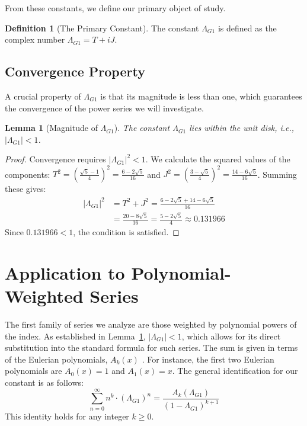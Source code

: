 \documentclass{amsart}
\theoremstyle{plain}
\newtheorem{lemma}[theorem]{Lemma}
\theoremstyle{definition}
\newtheorem{definition}[theorem]{Definition}
\theoremstyle{remark}
\newcommand{\LambdaG}{\Lambda_{G1}}
\begin{document}
From these constants, we define our primary object of study.
\begin{definition}[The Primary Constant]
The constant $\LambdaG$ is defined as the complex number $\LambdaG = T+iJ$.
\end{definition}

\subsection{Convergence Property}
A crucial property of $\LambdaG$ is that its magnitude is less than one, which guarantees the convergence of the power series we will investigate.

\begin{lemma}[Magnitude of $\LambdaG$]
\label{lem:convergence}
The constant $\LambdaG$ lies within the unit disk, i.e., $|\LambdaG| < 1$.
\end{lemma}
\begin{proof}
Convergence requires $|\LambdaG|^2 < 1$. We calculate the squared values of the components:
$T^2 = \left(\frac{\sqrt{5}-1}{4}\right)^2 = \frac{6-2\sqrt{5}}{16}$ and $J^2 = \left(\frac{3-\sqrt{5}}{4}\right)^2 = \frac{14-6\sqrt{5}}{16}$.
Summing these gives:
\begin{align*}
    |\LambdaG|^2 &= T^2+J^2 = \frac{6-2\sqrt{5} + 14-6\sqrt{5}}{16} \\
                 &= \frac{20-8\sqrt{5}}{16} = \frac{5-2\sqrt{5}}{4} \approx 0.131966
\end{align*}
Since $0.131966 < 1$, the condition is satisfied.
\end{proof}

\section{Application to Polynomial-Weighted Series}
The first family of series we analyze are those weighted by polynomial powers of the index. As established in Lemma~\ref{lem:convergence}, $|\LambdaG|<1$, which allows for its direct substitution into the standard formula for such series. The sum is given in terms of the Eulerian polynomials, $A_k(x)$ \cite{AandS}. For instance, the first two Eulerian polynomials are $A_0(x)=1$ and $A_1(x)=x$. The general identification for our constant is as follows:
$$ \sum_{n=0}^{\infty} n^k \cdot (\LambdaG)^n = \frac{A_k(\LambdaG)}{(1-\LambdaG)^{k+1}} $$
This identity holds for any integer $k \ge 0$.

\end{document}

